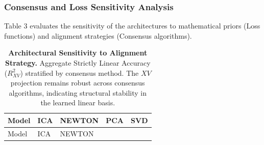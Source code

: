 \documentclass[
  letterpaper,
]{report}
\begin{document}
\subsubsection{Consensus and Loss Sensitivity
Analysis}\label{consensus-and-loss-sensitivity-analysis}

Table 3 evaluates the sensitivity of the architectures to mathematical
priors (Loss functions) and alignment strategies (Consensus algorithms).

\begin{longtable}[]{@{}
  >{\raggedright\arraybackslash}p{}
  >{\raggedright\arraybackslash}p{}
  >{\raggedright\arraybackslash}p{}
  >{\raggedright\arraybackslash}p{}
  >{\raggedright\arraybackslash}p{}@{}}
\caption{\textbf{Architectural Sensitivity to Alignment Strategy.}
Aggregate Strictly Linear Accuracy (\(R^2_{XV}\)) stratified by
consensus method. The \(XV\) projection remains robust across consensus
algorithms, indicating structural stability in the learned linear
basis.}\label{tbl-consensus-breakdown}\tabularnewline
\toprule\noalign{}
\begin{minipage}[b]{\linewidth}\raggedright
Model
\end{minipage} & \begin{minipage}[b]{\linewidth}\raggedright
ICA
\end{minipage} & \begin{minipage}[b]{\linewidth}\raggedright
NEWTON
\end{minipage} & \begin{minipage}[b]{\linewidth}\raggedright
PCA
\end{minipage} & \begin{minipage}[b]{\linewidth}\raggedright
SVD
\end{minipage} \\
\midrule\noalign{}
\endfirsthead
\toprule\noalign{}
\begin{minipage}[b]{\linewidth}\raggedright
Model
\end{minipage} & \begin{minipage}[b]{\linewidth}\raggedright
ICA
\end{minipage} & \begin{minipage}[b]{\linewidth}\raggedright
NEWTON
\end{minipage} & \begin{minipage}[b]{\linewidth}\raggedright

\end{minipage}
\end{longtable}
\end{document}
